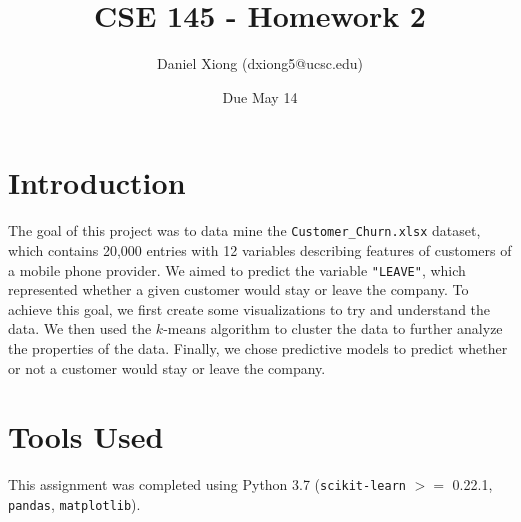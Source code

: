 \documentclass[12pt, notitlepage]{article}
\title{CSE 145 - Homework 2}
\author{Daniel Xiong (dxiong5@ucsc.edu)}
\date{Due May 14}
\begin{document}
\maketitle
\section{Introduction}
The goal of this project was to data mine the \texttt{Customer\_Churn.xlsx} dataset, which contains 20,000 entries with 12 variables describing features of customers of a mobile phone provider. We aimed to predict the variable \texttt{"LEAVE"}, which represented whether a given customer would stay or leave the company. To achieve this goal, we first create some visualizations to try and understand the data. We then used the $k$-means algorithm to cluster the data to further analyze the properties of the data. Finally, we chose predictive models to predict whether or not a customer would stay or leave the company.

\section{Tools Used}
This assignment was completed using Python 3.7 (\texttt{scikit-learn} $>=$ 0.22.1, \texttt{pandas}, \texttt{matplotlib}).
\end{document}
